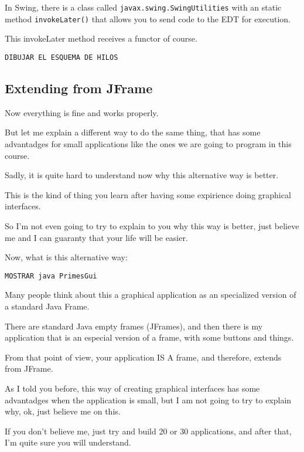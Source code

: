 \documentclass[a4paper, 9pt]{extarticle}
\begin{document}
In Swing, there is a class called \verb+javax.swing.SwingUtilities+ with an
static method \verb+invokeLater()+ that allows you to send code to the EDT for
execution.

This invokeLater method receives a functor of course.


\verb+DIBUJAR EL ESQUEMA DE HILOS+






\subsection{Extending from JFrame}

Now everything is fine and works properly.

But let me explain a different way to do the same thing, that has some
advantadges for small applications like the ones we are going to program in
this course.

Sadly, it is quite hard to understand now why this alternative way is better.

This is the kind of thing you learn after having some expirience doing
graphical interfaces.

So I'm not even going to try to explain to you why this way is better, just
believe me and I can guaranty that your life will be easier.

Now, what is this alternative way:

\verb+MOSTRAR java PrimesGui+

Many people think about this a graphical application as an specialized version
of a standard Java Frame.

There are standard Java empty frames (JFrames), and then there is my
application that is an especial version of a frame, with some buttons and
things.

From that point of view, your application IS A frame, and therefore, extends
from JFrame.


As I told you before, this way of creating graphical interfaces has some
advantadges when the application is small, but I am not going to try to explain
why, ok, just believe me on this.

If you don't believe me, just try and build 20 or 30 applications, and after
that, I'm quite sure you will understand.
\end{document}
